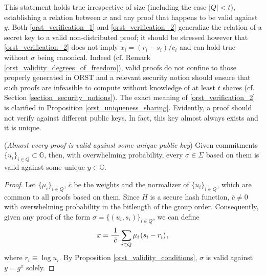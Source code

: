 \documentclass{iacrtrans}
\begin{document}
\noindent
This statement holds true irrespective of size
(including the case $|Q| < t$),
establishing a relation between $x$ and any proof
that happens to be valid against $y$.
Both \eqref{orst_verification_1} and \eqref{orst_verification_2}
generalize the relation of a secret key to a
valid non-distributed proof;
it should be stressed however that
\eqref{orst_verification_2} does not imply
$x_i = (r_i - s_i)/c_i$ and
can hold true without $\sigma$ being canonical.
Indeed (cf. Remark \ref{orst_validity_degrees_of_freedom}),
valid proofs do not confine to those properly
generated in \textsf{ORST} and a relevant security notion
should ensure that such proofs are infeasible to compute
without knowledge of at least $t$ shares
(cf. Section \ref{section_security_notions}).
The exact meaning of \eqref{orst_verification_2}
is clarified in Proposition \ref{orst_uniqueness_sharing}.
Evidently, a proof should not verify against
different public keys.
In fact, this key almost always exists and it is unique.

\begin{prop}\label{orst_uniqueness_public_key}
\textup{(\textit{Almost every proof is valid against
some unique public key})}
Given commitments $\{u_i\}_{i \in Q} \subset \mathbb{G}$,
then, with overwhelming probability,
every $\sigma \in \Sigma$ based on them
is valid against some unique $y \in \mathbb{G}$.
\end{prop}

\begin{proof}
Let $\{\mu_i\}_{i \in Q}$, $\bar{c}$
be the weights and the normalizer of $\{u_i\}_{i \in Q}$,
which are common to all proofs based on them.
Since $H$ is a secure hash function,
$\bar{c} \neq 0$ with overwhelming probability in
the bitlength of the group order.
Consequently, given any proof of the form
$\sigma = \{(u_i, s_i)\}_{i \in Q}$, we can define
\vspace{5pt}
\begin{equation*}
x = \frac{1}{\ \bar{c}\ }
\sum_{i \in Q} \mu_i\hspace{1pt}(s_i - r_i)\hspace{1pt},
\vspace{5pt}
\end{equation*}
where $r_i \equiv \log u_i$.
By Proposition \ref{orst_validity_conditions},
$\sigma$ is valid against $y = g ^ x$ solely.
\vspace{5pt}
\end{proof}
\end{document}
